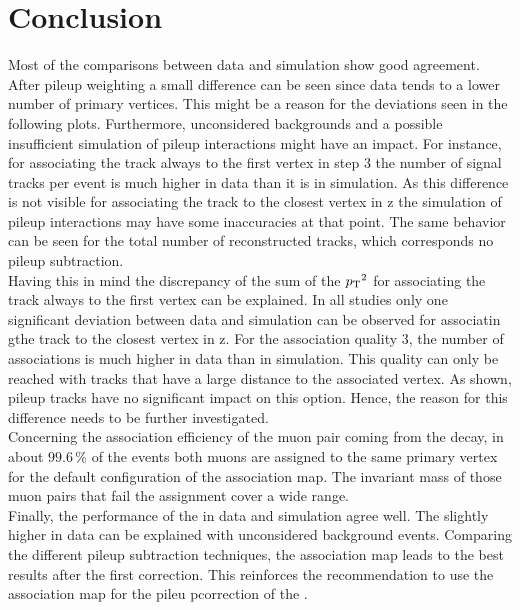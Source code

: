 \section{Conclusion}

Most of the comparisons between data and simulation show good agreement. After pileup weighting a small difference can be seen since data tends to a lower number of primary vertices. This might be a reason for the deviations seen in the following plots. Furthermore, unconsidered backgrounds and a possible insufficient simulation of pileup interactions might have an impact. For instance, for associating the track always to the first vertex in step 3 the number of signal tracks per event is much higher in data than it is in simulation. As this difference is not visible for associating the track to the closest vertex in z the simulation of pileup interactions may have some inaccuracies at that point. The same behavior can be seen for the total number of reconstructed tracks, which corresponds no pileup subtraction.\\
Having this in mind the discrepancy of the sum of the $p_{\mathrm{T}}{}^{2}$ for associating the track always to the first vertex can be explained. In all studies only one significant deviation between data and simulation can be observed for associatin gthe track to the closest vertex in z. For the association quality 3, the number of associations is much higher in data than in simulation. This quality can only be reached with tracks that have a large distance to the associated vertex. As shown, pileup tracks have no significant impact on this option. Hence, the reason for this difference needs to be further investigated.\\
Concerning the association efficiency of the muon pair coming from the \Zz decay, in about $99.6\,\%$ of the events both muons are assigned to the same primary vertex for the default configuration of the association map. The invariant mass of those muon pairs that fail the assignment cover a wide range. \\
Finally, the performance of the \MET{} in data and simulation agree well. The slightly higher \MET{} in data can be explained with unconsidered background events. Comparing the different pileup subtraction techniques, the association map leads to the best results after the first correction. This reinforces the recommendation to use the association map for the pileu pcorrection of the \MET{}.